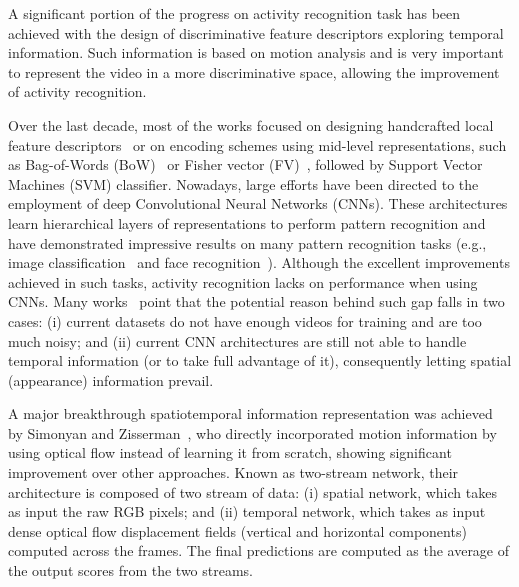 \documentclass[10pt,conference]{IEEEtran}
\begin{document}
A significant portion of the progress on activity recognition task has been achieved with the design of discriminative feature descriptors exploring temporal information. Such information is based on motion analysis and is very important to represent the video in a more discriminative space, allowing the improvement of activity recognition.

Over the last decade, most of the works focused on designing handcrafted local feature descriptors~\cite{Scovanner:2007, Laptev:2008, Klaser:2008, Wang:2011} or on encoding schemes using mid-level representations, such as Bag-of-Words (BoW)~\cite{Sivic:2003} or Fisher vector (FV)~\cite{Sanchez:2013}, followed by Support Vector Machines (SVM) classifier. Nowadays, large efforts have been directed to the employment of deep Convolutional Neural Networks (CNNs). %
These architectures learn hierarchical layers of representations to perform pattern recognition and have demonstrated impressive results on many pattern recognition tasks (e.g., image classification~\cite{Krizhevsky:2012} and face recognition~\cite{Schroff:2015}). Although the excellent improvements achieved in such tasks, activity recognition lacks on performance when using CNNs. Many works~\cite{Feichtenhofer:2016, Park:2016, Diba:2016} point that the potential reason behind such gap falls in two cases: (i) current datasets do not have enough videos for training and are too much noisy; and (ii) current CNN architectures are still not able to handle temporal information (or to take full advantage of it), consequently letting spatial (appearance) information prevail. %

A major breakthrough spatiotemporal information representation was achieved by Simonyan and Zisserman~\cite{Simonyan:2014}, who directly incorporated motion information by using optical flow instead of learning it from scratch, showing significant improvement over other approaches. Known as two-stream network, their architecture is composed of two stream of data: (i) spatial network, which takes as input the raw RGB pixels; and (ii) temporal network, which takes as input dense optical flow displacement fields (vertical and horizontal components) computed across the frames. The final predictions are computed as the average of the output scores from the two streams.
\end{document}
